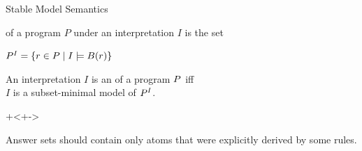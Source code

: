 \documentclass{beamer}
\begin{document}
\begin{frame}{Stable Model Semantics}
	\onslide<+->
	
	\begin{definition}
		 of a program $P$ under an interpretation $I$ is the set
		\begin{center}
			${P}^{I} = \{r \in P \mid I \models B\mathrm{(}{r}\mathrm{)}\}$
		\end{center}
	\end{definition}
	
	\begin{definition}
		An interpretation $I$ is an  of a program $P$ iff\\
		$I$ is a subset-minimal model of ${P}^{I}$.
	\end{definition}
	
	\onslide+<+->
	
	Answer sets should contain only atoms that were explicitly derived by some rules.
	
\end{frame}
\end{document}
